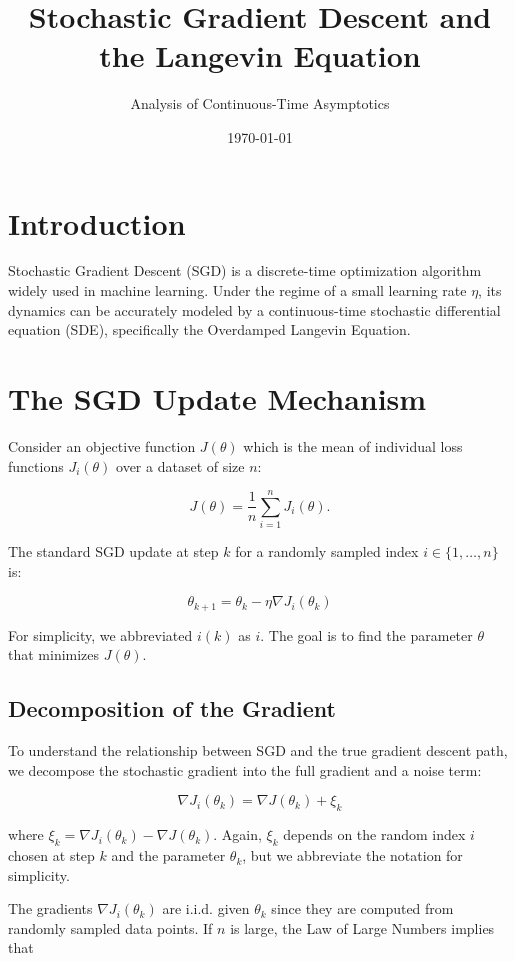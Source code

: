 \documentclass[11pt]{article}
\title{Stochastic Gradient Descent and the Langevin Equation}
\author{Analysis of Continuous-Time Asymptotics}
\date{\today}
\begin{document}
\maketitle

\section{Introduction}

Stochastic Gradient Descent (SGD) is a discrete-time optimization algorithm widely used in machine learning. Under the regime of a small learning rate $\eta$, its dynamics can be accurately modeled by a continuous-time stochastic differential equation (SDE), specifically the Overdamped Langevin Equation.

\section{The SGD Update Mechanism}

Consider an objective function $J(\theta)$ which is the mean of individual loss functions $J_i(\theta)$ over a dataset of size $n$:

$$
J(\theta) = \frac{1}{n} \sum_{i=1}^{n} J_i(\theta).
$$

The standard SGD update at step $k$ for a randomly sampled index $i \in \{1, \dots, n\}$ is:

$$
\theta_{k+1} = \theta_k - \eta \nabla J_i(\theta_k)
$$

For simplicity, we abbreviated $i(k)$ as $i$.
The goal is to find the parameter $\theta$ that minimizes $J(\theta)$.

\subsection{Decomposition of the Gradient}

To understand the relationship between SGD and the true gradient descent path, we decompose the stochastic gradient into the full gradient and a noise term:

$$
\nabla J_i(\theta_k) = \nabla J(\theta_k) + \xi_k
$$

where $\xi_k = \nabla J_i(\theta_k) - \nabla J(\theta_k)$. 
Again, $\xi_k$ depends on the random index $i$ chosen at step $k$ and 
the parameter $\theta_k$, but we abbreviate the notation for simplicity.

The gradients $\nabla J_i(\theta_k)$ are i.i.d. given $\theta_k$ since 
they are computed from randomly sampled data points. If $n$ is large, 
the Law of Large Numbers implies that
\end{document}
